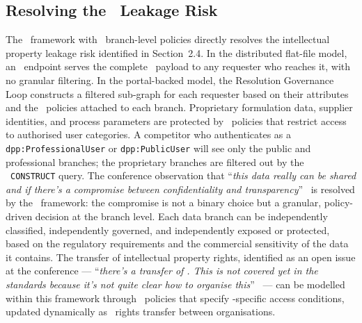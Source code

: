 \subsection{Resolving the \IP\ Leakage Risk}

The \ABAC\ framework with \ODRL\ branch-level policies directly resolves the
intellectual property leakage risk identified in Section~2.4. In the distributed
flat-file model, an \REO\ endpoint serves the complete \DPP\ payload to any
requester who reaches it, with no granular filtering. In the portal-backed
model, the Resolution Governance Loop constructs a filtered sub-graph for each
requester based on their attributes and the \ODRL\ policies attached to each
branch. Proprietary formulation data, supplier identities, and process
parameters are protected by \ODRL\ policies that restrict access to authorised
user categories. A competitor who authenticates as a
\texttt{dpp:ProfessionalUser} or \texttt{dpp:PublicUser} will see only the
public and professional branches; the proprietary branches are filtered out by
the \SPARQL\ \texttt{CONSTRUCT} query. The conference observation that
``\textit{this data really can be shared and if there's a compromise between
confidentiality and transparency}''~\cite{dpp4eu2026_day1} is resolved by the
\ABAC\ framework: the compromise is not a binary choice but a granular,
policy-driven decision at the branch level. Each data branch can be
independently classified, independently governed, and independently exposed or
protected, based on the regulatory requirements and the commercial sensitivity
of the data it contains. The transfer of intellectual property rights,
identified as an open issue at the conference --- ``\textit{there's a transfer
of \IPI. This is not covered yet in the standards because it's not quite clear
how to organise this}''~\cite{dpp4eu2026_day1} --- can be modelled within this
framework through \ODRL\ policies that specify \IPI-specific access conditions,
updated dynamically as \IP\ rights transfer between organisations.
